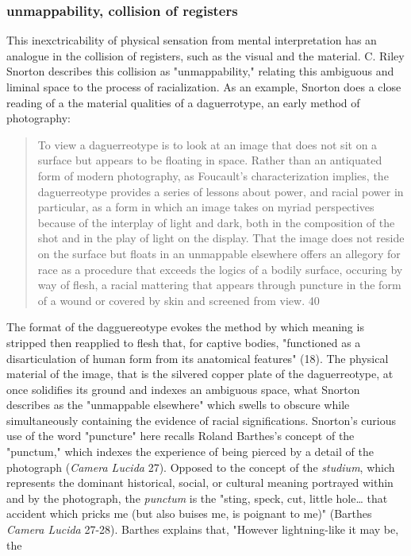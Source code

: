 \documentclass[11pt]{article}
\begin{document}
\subsubsection{unmappability, collision of registers}
\label{sec:org670e55c}
This inexctricability of physical sensation from mental interpretation
has an analogue in the collision of registers, such as the visual and
the material. C. Riley Snorton describes this collision as
"unmappability," relating this ambiguous and liminal space to the
process of racialization. As an example, Snorton does a close reading
of a the material qualities of a daguerrotype, an early method of
photography:
\begin{quote}
To view a daguerreotype is to look at an image that does not sit on a
surface but appears to be floating in space. Rather than an antiquated
form of modern photography, as Foucault’s characterization implies,
the daguerreotype provides a series of lessons about power, and racial
power in particular, as a form in which an image takes on myriad
perspectives because of the interplay of light and dark, both in the
composition of the shot and in the play of light on the display. That
the image does not reside on the surface but floats in an unmappable
elsewhere offers an allegory for race as a procedure that exceeds the
logics of a bodily surface, occuring by way of flesh, a racial
mattering that appears through puncture in the form of a wound or
covered by skin and screened from view. 40
\end{quote}
The format of the dagguereotype evokes the method by which meaning is
stripped then reapplied to flesh that, for captive bodies, "functioned
as a disarticulation of human form from its anatomical features"
(18). The physical material of the image, that is the silvered copper
plate of the daguerreotype, at once solidifies its ground and indexes
an ambiguous space, what Snorton describes as the "unmappable
elsewhere" which swells to obscure while simultaneously containing the
evidence of racial significations. Snorton's curious use of the word
"puncture" here recalls Roland Barthes's concept of the "punctum,"
which indexes the experience of being pierced by a detail of the
photograph (\emph{Camera Lucida} 27). Opposed to the concept of the
\emph{studium}, which represents the dominant historical, social, or
cultural meaning portrayed within and by the photograph, the \emph{punctum}
is the "sting, speck, cut, little hole\ldots{} that accident which pricks
me (but also buises me, is poignant to me)" (Barthes \emph{Camera Lucida}
27-28). Barthes explains that, "However lightning-like it may be, the
\end{document}
